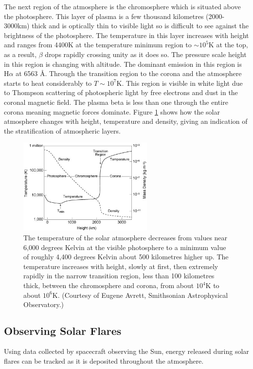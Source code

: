 The next region of the atmosphere is the chromosphere which is situated above the photosphere. This layer of plasma is a few thousand kilometres (2000-3000km) thick and is optically thin to visible light so is difficult to see against the brightness of the photosphere. The temperature in this layer increases with height and ranges from 4400K at the temperature minimum region to $\sim10^{5}$K at the top, as a result, $\beta$ drops rapidly crossing unity as it does so. The pressure scale height in this region is changing with altitude. The dominant emission in this region is H$\alpha$ at 6563 \AA. Through the transition region to the corona and the atmosphere starts to heat considerably to $T\sim10^{7}$K. This region is visible in white light due to Thompson scattering of photospheric light by free electrons and dust in the coronal magnetic field. The plasma beta is less than one through the entire corona meaning magnetic forces dominate. Figure \ref{solatm} shows how the solar atmosphere changes with height, temperature and density, giving an indication of the stratification of atmospheric layers.

\begin{figure}[H]
  \begin{center}
    \includegraphics[width=0.6\textwidth]{solar-atm-plot}
\caption{The temperature of the solar atmosphere decreases from values near 6,000 degrees Kelvin at the visible photosphere to a minimum value of roughly 4,400 degrees Kelvin about 500 kilometres higher up. The temperature increases with height, slowly at first, then extremely rapidly in the narrow transition region, less than 100 kilometres thick, between the chromosphere and corona, from about $10^{4}$K to about $10^{6}$K. (Courtesy of Eugene Avrett, Smithsonian Astrophysical Observatory.)}\label{solatm}
  \end{center}
\end{figure}

  
\subsection{Observing Solar Flares}
Using data collected by spacecraft observing the Sun, energy released during solar flares can be tracked as it is deposited throughout the atmosphere. 

